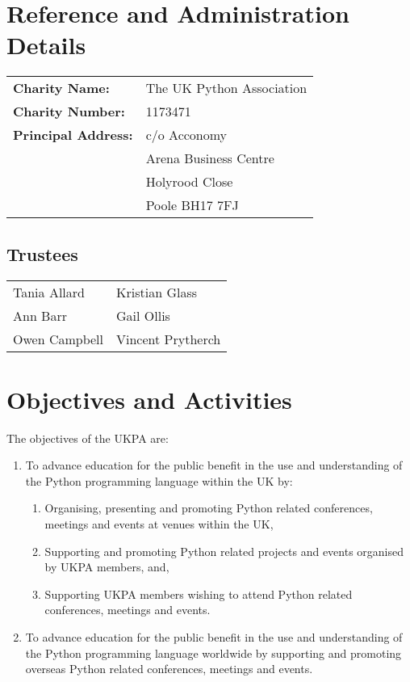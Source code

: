 \documentclass[11pt, final]{article}
\begin{document}

    \section{Reference and Administration Details}
    \begin{tabular}{l l}
        \textbf{Charity Name:} & The UK Python Association \\
        \textbf{Charity Number:} & 1173471 \\
        \textbf{Principal Address:} & c/o Acconomy \\
	& Arena Business Centre \\
	& Holyrood Close \\
	& Poole BH17 7FJ\\
    \end{tabular}

        \subsection{Trustees}
        \begin{tabular}{l l}
    	        Tania Allard & Kristian Glass\\
                Ann Barr & Gail Ollis\\
                Owen Campbell & Vincent Prytherch\\
        \end{tabular}

    \section{Objectives and Activities}
	The objectives of the UKPA are:
	\begin{enumerate}
		\item To advance education for the public benefit in the use and understanding of the Python programming language within the UK by:
		\begin{enumerate}
			\item Organising, presenting and promoting Python related conferences, meetings and events at venues within the UK,
			\item Supporting and promoting Python related projects and events organised by UKPA members, and,
			\item Supporting UKPA members wishing to attend Python related conferences, meetings and events.
		\end{enumerate}
		\item To advance education for the public benefit in the use and understanding of the Python programming language worldwide by supporting and promoting overseas Python related conferences, meetings and events.
	\end{enumerate}
\end{document}
